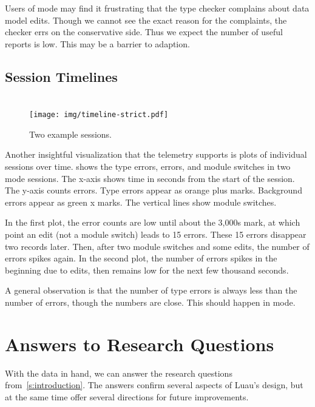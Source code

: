 \documentclass[english,submission,cleveref]{programming}
\begin{document}
Users of \mstrict{} mode may find it frustrating that the type checker complains
about data model edits.
Though we cannot see the exact reason for the complaints, the checker errs on
the conservative side.
Thus we expect the number of useful reports is low.
This may be a barrier to adaption.


\subsection{Session Timelines}

\begin{figure}[t]\centering

  \medskip{}
  \mstrict{}\\
  \texttt{[image: img/timeline-strict.pdf]}

  \caption{Two example sessions.}
  \label{f:indy-session}
\end{figure}

Another insightful visualization that the telemetry supports is plots of individual sessions
over time.
 shows the type errors, \FS{} errors, and module switches
in two \mstrict{} mode sessions.
The x-axis shows time in seconds from the start of the session.
The y-axis counts errors.
Type errors appear as orange plus marks.
Background errors appear as green x marks.
The vertical lines show module switches.

In the first plot, the error counts are low until about the 3,000s mark,
at which point an edit (not a module switch) leads to 15 errors.
These 15 errors disappear two records later.
Then, after two module switches and some edits, the number of errors spikes again.
In the second plot, the number of errors spikes in the beginning due to edits,
then remains low for the next few thousand seconds.

A general observation is that the number of type errors is always less than the number of \FS{}
errors, though the numbers are close.
This should happen in \mstrict{} mode.


\section{Answers to Research Questions}
\label{s:discussion}

With the data in hand, we can answer the research questions
from~\cref{s:introduction}.
The answers confirm several aspects of Luau's design, but
at the same time offer several directions for future improvements.
\end{document}
